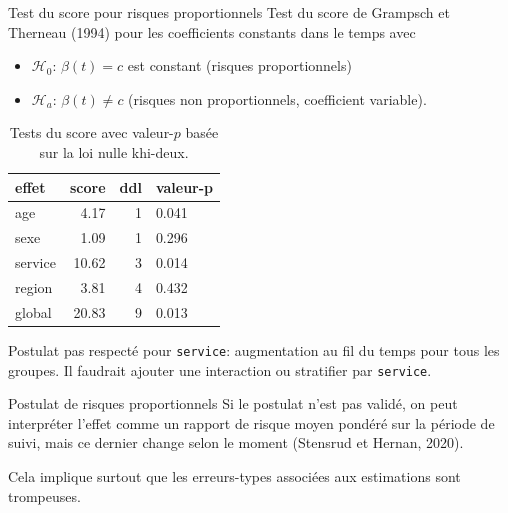 \documentclass[
  ignorenonframetext,
]{beamer}
\providecommand{\tightlist}{%
  \setlength{\itemsep}{0pt}\setlength{\parskip}{0pt}}\usepackage{longtable,booktabs,array}
\begin{document}
\begin{frame}[fragile]{Test du score pour risques proportionnels}
\protect\hypertarget{test-du-score-pour-risques-proportionnels}{}
Test du score de Grampsch et Therneau (1994) pour les coefficients
constants dans le temps avec

\begin{itemize}
\tightlist
\item
  \(\mathscr{H}_0\): \(\beta(t)=c\) est constant (risques
  proportionnels)
\item
  \(\mathscr{H}_a\): \(\beta(t) \neq c\) (risques non proportionnels,
  coefficient variable).
\end{itemize}

\hypertarget{tbl-coxph-hypothese}{}
\begin{table}
\caption{\label{tbl-coxph-hypothese}Tests du score avec valeur-\(p\) basée sur la loi nulle khi-deux. }\tabularnewline

\centering
\begin{tabular}{lrrl}
\toprule
effet & score & ddl & valeur-p\\
\midrule
age & 4.17 & 1 & 0.041\\
sexe & 1.09 & 1 & 0.296\\
service & 10.62 & 3 & 0.014\\
region & 3.81 & 4 & 0.432\\
global & 20.83 & 9 & 0.013\\
\bottomrule
\end{tabular}
\end{table}

\footnotesize

Postulat pas respecté pour \texttt{service}: augmentation au fil du
temps pour tous les groupes. Il faudrait ajouter une interaction ou
stratifier par \texttt{service}.
\end{frame}

\begin{frame}{Postulat de risques proportionnels}
\protect\hypertarget{postulat-de-risques-proportionnels-1}{}
Si le postulat n'est pas validé, on peut interpréter l'effet comme un
rapport de risque moyen pondéré sur la période de suivi, mais ce dernier
change selon le moment (Stensrud et Hernan, 2020).

Cela implique surtout que les erreurs-types associées aux estimations
sont trompeuses.
\end{frame}
\end{document}
